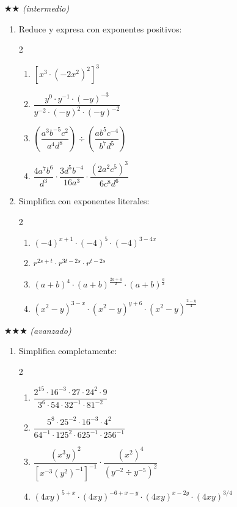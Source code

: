 \documentclass[11pt, letterpaper]{article}
\begin{document}
$\bigstar\bigstar$ \textit{(intermedio)}

\begin{enumerate}[label=\textbf{\arabic*.}, leftmargin=*, resume]
  \item Reduce y expresa con exponentes positivos:
  \begin{multicols}{2}
  \begin{enumerate}[label=\alph*)]
    \item $[x^3\cdot(-2x^2)^2]^3$
    \item $\dfrac{y^0\cdot y^{-1}\cdot(-y)^{-3}}{y^{-2}\cdot(-y)^2\cdot(-y)^{-2}}$
    \item $\left(\dfrac{a^3b^{-5}c^2}{a^4d^8}\right) \div \left(\dfrac{ab^5c^{-4}}{b^7d^5}\right)$
    \item $\dfrac{4a^7b^6}{d^3}\cdot\dfrac{3d^5b^{-4}}{16a^3}\cdot\dfrac{(2a^2c^5)^3}{6c^8d^6}$
  \end{enumerate}
  \end{multicols}

  \item Simplifica con exponentes literales:
  \begin{multicols}{2}
  \begin{enumerate}[label=\alph*)]
    \item $(-4)^{x+1}\cdot(-4)^5\cdot(-4)^{3-4x}$
    \item $r^{2s+t}\cdot r^{3t-2s}\cdot r^{t-2s}$
    \item $(a+b)^4\cdot(a+b)^{\frac{2a+4}{2}}\cdot(a+b)^{\frac{a}{2}}$
    \item $(x^2-y)^{3-x}\cdot(x^2-y)^{y+6}\cdot(x^2-y)^{\frac{2-y}{4}}$
  \end{enumerate}
  \end{multicols}
\end{enumerate}

$\bigstar\bigstar\bigstar$ \textit{(avanzado)}

\begin{enumerate}[label=\textbf{\arabic*.}, leftmargin=*, resume]
  \item Simplifica completamente:
  \begin{multicols}{2}
  \begin{enumerate}[label=\alph*)]
    \item $\dfrac{2^{15}\cdot 16^{-3}\cdot 27\cdot 24^2\cdot 9}{3^6\cdot 54\cdot 32^{-1}\cdot 81^{-2}}$
    \item $\dfrac{5^8\cdot 25^{-2}\cdot 16^{-3}\cdot 4^2}{64^{-1}\cdot 125^2\cdot 625^{-1}\cdot 256^{-1}}$
    \item $\dfrac{(x^3y)^2}{[x^{-3}(y^2)^{-1}]^{-1}}\cdot\dfrac{(x^2)^4}{(y^{-2} \div y^{-5})^2}$
    \item $(4xy)^{5+x}\cdot(4xy)^{-6+x-y}\cdot(4xy)^{x-2y}\cdot(4xy)^{3/4}$
  \end{enumerate}
  \end{multicols}
\end{enumerate}
\end{document}
